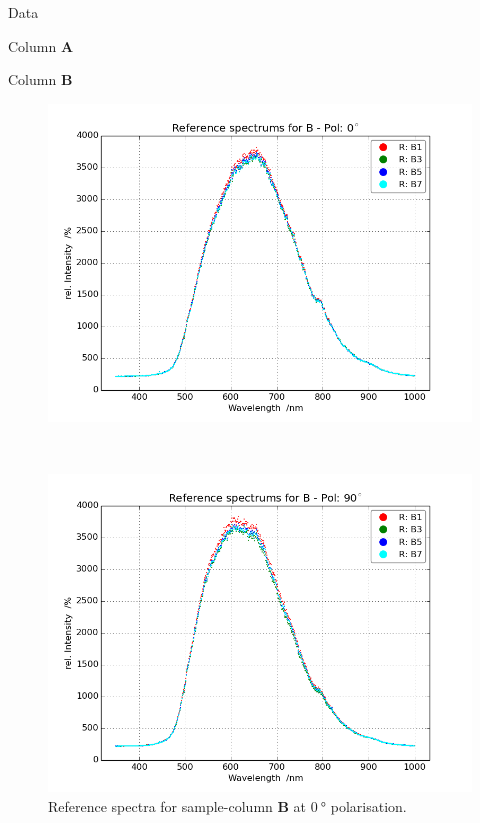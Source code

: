 \begin{appendix}
\begin{chapter}{Data}
\begin{section}{Column \textbf{A}}
    \end{section}
    
    
    
    \newpage
    \begin{section}{Column \textbf{B}}
      \label{Appendix:DataB}
      
      \begin{figure}[ht!]
        \centering
        \begin{minipage}{.92\textwidth}
          \centering
          \includegraphics[width=\textwidth]{Figures/Refspec_BPol0.png}
          \caption{Reference spectra for sample-column \textbf{B} at
              $\SI{0}{\degree}$ polarisation.}
          \label{fig:Refspec_BPol0}
        \end{minipage}\\
        \begin{minipage}{.92\textwidth}
          \centering
          \includegraphics[width=\textwidth]{Figures/Refspec_BPol90.png}

\end{minipage}
\end{figure}
\end{section}
\end{chapter}
\end{appendix}
